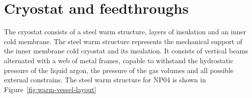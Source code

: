 







\section{Cryostat and feedthroughs}

The cryostat consists of a steel warm structure, layers of insulation and an inner cold membrane.  The steel warm structure represents the mechanical support of the inner membrane cold cryostat and its insulation. It consists of vertical beams alternated with a web of metal frames, capable to withstand the hydrostatic pressure of the liquid argon, the pressure of the gas volumes and all possible external constrains. The steel warm structure for NP04 is shown in Figure~\ref{fig:warm-vessel-layout}

